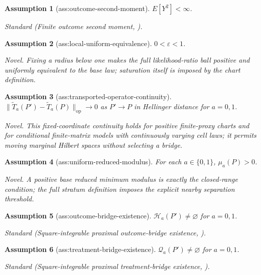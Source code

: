 \documentclass{article}
\newtheorem{assumption}{Assumption}
\begin{document}
\begin{assumption}[ass:outcome-second-moment]\label{ass:outcome-second-moment}
\(E[Y^2]<\infty\).
\par\smallskip\noindent\emph{Standard} (Finite outcome second moment, \cite{BennettEtAl2026StronglyIdentified}).
\end{assumption}

\begin{assumption}[ass:local-uniform-equivalence]\label{ass:local-uniform-equivalence}
\(0<\varepsilon<1\).
\par\smallskip\noindent\emph{Novel.} Fixing a radius below one makes the full likelihood-ratio ball positive and uniformly equivalent to the base law; saturation itself is imposed by the chart definition.
\end{assumption}

\begin{assumption}[ass:transported-operator-continuity]\label{ass:transported-operator-continuity}
\(\|\widetilde T_a(P')-\widetilde T_a(P)\|_{\mathrm{op}}\to0\) as \(P'\to P\) in Hellinger distance for \(a=0,1\).
\par\smallskip\noindent\emph{Novel.} This fixed-coordinate continuity holds for positive finite-proxy charts and for conditional finite-matrix models with continuously varying cell laws; it permits moving marginal Hilbert spaces without selecting a bridge.
\end{assumption}

\begin{assumption}[ass:uniform-reduced-modulus]\label{ass:uniform-reduced-modulus}
For each \(a\in\{0,1\}\), \(\mu_a(P)>0\).
\par\smallskip\noindent\emph{Novel.} A positive base reduced minimum modulus is exactly the closed-range condition; the full stratum definition imposes the explicit nearby separation threshold.
\end{assumption}

\begin{assumption}[ass:outcome-bridge-existence]\label{ass:outcome-bridge-existence}
\(\mathcal H_a(P')\neq\varnothing\) for \(a=0,1\).
\par\smallskip\noindent\emph{Standard} (Square-integrable proximal outcome-bridge existence, \cite{ZhangLiMiaoTchetgen2023Nonuniqueness}).
\end{assumption}

\begin{assumption}[ass:treatment-bridge-existence]\label{ass:treatment-bridge-existence}
\(\mathcal Q_a(P')\neq\varnothing\) for \(a=0,1\).
\par\smallskip\noindent\emph{Standard} (Square-integrable proximal treatment-bridge existence, \cite{ZhangLiMiaoTchetgen2023Nonuniqueness}).
\end{assumption}
\end{document}
